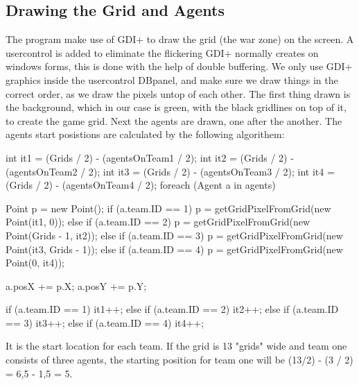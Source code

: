 \subsection*{Drawing the Grid and Agents}
\label{sec:drawing}
The program make use of GDI+ \cite{misc:gdiplus} to draw the grid (the war zone) on the screen. A usercontrol is added to eliminate the flickering GDI+ normally creates on windows forms, this is done with the help of double buffering.
We only use GDI+ graphics inside the usercontrol DBpanel, and make sure we draw things in the correct order, as we draw the pixels untop of each other. The first thing drawn is the background, which in our case is green, with the black gridlines on top of it, to create the game grid. Next the agents are drawn, one after the another.
The agents start posistions are calculated by the following algorithem:
\begin{source}[]{}                    
            int it1 = (Grids / 2) - (agentsOnTeam1 / 2);
            int it2 = (Grids / 2) - (agentsOnTeam2 / 2);
            int it3 = (Grids / 2) - (agentsOnTeam3 / 2);
            int it4 = (Grids / 2) - (agentsOnTeam4 / 2);
            foreach (Agent a in agents)
            {
                Point p = new Point();
                if (a.team.ID == 1)
                {
                    p = getGridPixelFromGrid(new Point(it1, 0));
                }
                else if (a.team.ID == 2)
                {
                    p = getGridPixelFromGrid(new Point(Grids - 1, it2));
                }
                else if (a.team.ID == 3)
                {
                    p = getGridPixelFromGrid(new Point(it3, Grids - 1));
                }
                else if (a.team.ID == 4)
                {
                    p = getGridPixelFromGrid(new Point(0, it4));
                }

                a.posX += p.X;
                a.posY += p.Y;

                if (a.team.ID == 1)
                {
                    it1++;
                }
                else if (a.team.ID == 2)
                {
                    it2++;
                }
                else if (a.team.ID == 3)
                {
                    it3++;
                }
                else if (a.team.ID == 4)
                {
                    it4++;
                }
            }
\end{source}
It is the start location for each team. If the grid is 13 "grids" wide and team one consists of three agents, the starting position for team one will be (13/2) - (3 / 2) = 6,5 - 1,5 = 5.